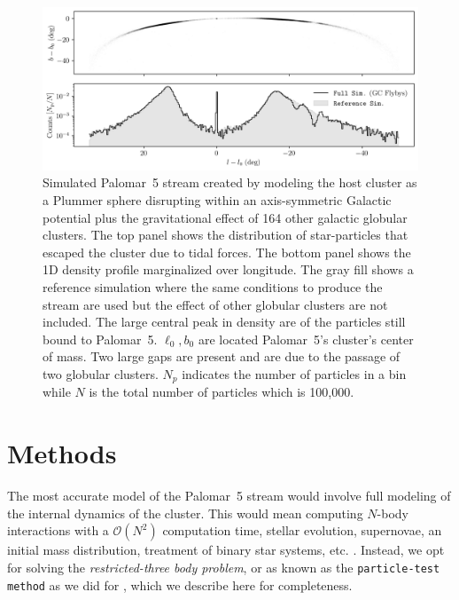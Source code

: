 \documentclass[draft]{aa}
\begin{document}
  \begin{figure}
    \centering
    \includegraphics[width=\linewidth]{stream_on_sky_Pal5_monte-carlo-009_pouliasis2017pii-GCNBody_pouliasis2017pii.png}
    \caption{Simulated Palomar~5 stream created by modeling the host cluster as a Plummer sphere disrupting within an axis-symmetric Galactic potential plus the gravitational effect of 164 other galactic globular clusters. The top panel shows the distribution of star-particles that escaped the cluster due to tidal forces. The bottom panel shows the 1D density profile marginalized over longitude. The gray fill shows a reference simulation where the same conditions to produce the stream are used but the effect of other globular clusters are not included. The large central peak in density are of the particles still bound to Palomar~5. $\ell_0,b_0$ are located Palomar~5's cluster's center of mass. Two large gaps are present and are due to the passage of two globular clusters. $N_p$ indicates the number of particles in a bin while $N$ is the total number of particles which is 100,000.}
    \label{fig:stream_on_sky}
    \end{figure}


\section{Methods}
  The most accurate model of the Palomar~5 stream would involve full modeling of the internal dynamics of the cluster. This would mean computing $N$-body interactions with a $\mathcal{O}(N^2)$ computation time, stellar evolution, supernovae, an initial mass distribution, treatment of binary star systems, etc. \citep[for such an example, see][]{2021NatAs...5..957G, 2016MNRAS.458.1450W}. Instead, we opt for solving the \textit{restricted-three body problem}, or as known as the \texttt{particle-test method} as we did for \citet{2023A&A...673A..44F}, which we describe here for completeness. 
\end{document}
